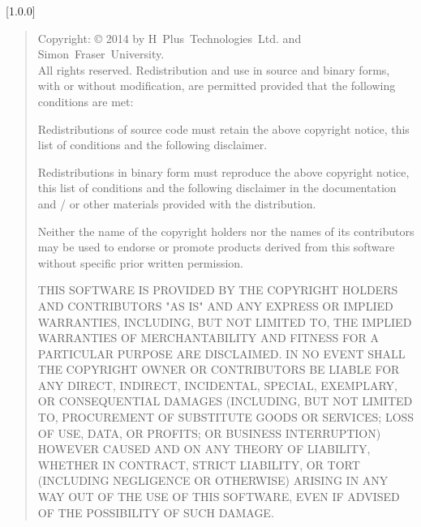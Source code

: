 [1.0.0]
\begin{quote}
\begin{small}
Copyright: \copyright{} 2014 by H~Plus~Technologies~Ltd. and Simon~Fraser~University.
\\
All rights reserved. Redistribution and use in source and binary forms, with or without
modification, are permitted provided that the following conditions are met:
\begin{tightItems}
\item Redistributions of source code must retain the above copyright notice, this list of
conditions and the following disclaimer.
\item Redistributions in binary form must reproduce the above copyright notice, this list
of conditions and the following disclaimer in the documentation and / or other materials
provided with the distribution.
\item Neither the name of the copyright holders nor the names of its contributors may be
used to endorse or promote products derived from this software without specific prior
written permission.
\end{tightItems}
THIS SOFTWARE IS PROVIDED BY THE COPYRIGHT HOLDERS AND CONTRIBUTORS "AS IS" AND ANY
EXPRESS OR IMPLIED WARRANTIES, INCLUDING, BUT NOT LIMITED TO, THE IMPLIED WARRANTIES OF
MERCHANTABILITY AND FITNESS FOR A PARTICULAR PURPOSE ARE DISCLAIMED.
IN NO EVENT SHALL THE COPYRIGHT OWNER OR CONTRIBUTORS BE LIABLE FOR ANY DIRECT, INDIRECT,
INCIDENTAL, SPECIAL, EXEMPLARY, OR CONSEQUENTIAL DAMAGES (INCLUDING, BUT NOT LIMITED TO,
PROCUREMENT OF SUBSTITUTE GOODS OR SERVICES; LOSS OF USE, DATA, OR PROFITS; OR BUSINESS
INTERRUPTION) HOWEVER CAUSED AND ON ANY THEORY OF LIABILITY, WHETHER IN CONTRACT, STRICT
LIABILITY, OR TORT (INCLUDING NEGLIGENCE OR OTHERWISE) ARISING IN ANY WAY OUT OF THE USE
OF THIS SOFTWARE, EVEN IF ADVISED OF THE POSSIBILITY OF SUCH DAMAGE.\\


\end{small}
\end{quote}
